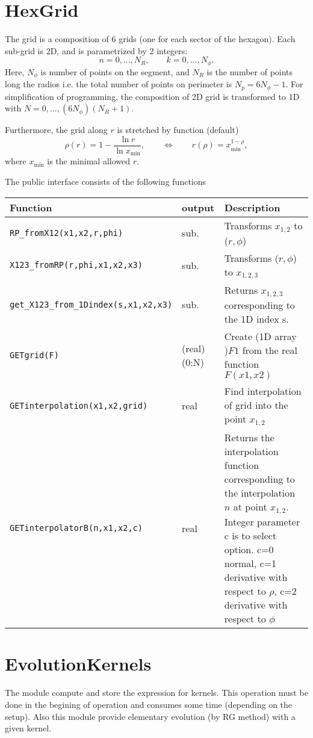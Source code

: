 \documentclass[prd,nofootinbib,eqsecnum,final]{revtex4}
\renewcommand{\(}{\left(}
\renewcommand{\)}{\right)}
\renewcommand{\[}{\left[}
\renewcommand{\]}{\right]}
\begin{document}
\section{HexGrid}

The grid is a composition of 6 grids (one for each sector of the hexagon). Each sub-grid is 2D, and  is parametrized by 2 integers:
$$n=0,...,N_R, \qquad k=0,...,N_\phi .$$
Here, $N_\phi$ is number of points on the segment, and $N_R$ is the number of points long the radios i.e. the total number of points on perimeter is $N_p=6N_\phi-1$. For simplification of programming, the composition of 2D grid is transformed to 1D with $N=0,...,(6N_\phi)(N_R+1)$.

Furthermore, the grid along $r$ is stretched by function (default)
$$
\rho(r)=1-\frac{\ln r}{\ln x_{\text{min}}},\qquad\Leftrightarrow \qquad r(\rho)=x_{\text{min}}^{1-\rho},
$$
where $x_{\text{min}}$ is the minimal allowed $r$.

The public interface consists of the following functions
\begin{longtable}{||p{5cm}|p{2cm}|p{9cm}||}
Function & output & Description
\\
\hline\hline
\texttt{RP\_fromX12(x1,x2,r,phi)} & sub. & Transforms $x_{1,2}$ to ($r,\phi$)
\\\hline
\texttt{X123\_fromRP(r,phi,x1,x2,x3)} & sub. & Transforms ($r,\phi$) to $x_{1,2,3}$
\\\hline
\texttt{get\_X123\_from\_1Dindex(s,x1,x2,x3)} & sub. & Returns $x_{1,2,3}$ corresponding to the 1D index s.
\\\hline
\texttt{GETgrid(F)} & (real)(0:N) & Create (1D array )$F1$ from the real function $F(x1,x2)$
\\\hline
\texttt{GETinterpolation(x1,x2,grid)} & real & Find interpolation of grid into the point $x_{1,2}$
\\\hline
\texttt{GETinterpolatorB(n,x1,x2,c)} & real & Returns the interpolation function corresponding to the interpolation $n$ at point $x_{1,2}$. Integer parameter c is to select option. c=0 normal, c=1 derivative with respect to $\rho$, c=2 derivative with respect to $\phi$
\end{longtable}

\section{EvolutionKernels}

The module compute and store the expression for kernels. This operation must be done in the begining of operation and consumes some time (depending on the setup). Also this module provide elementary evolution (by RG method) with a given kernel.
\end{document}
